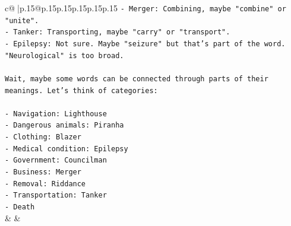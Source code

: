 \documentclass{article}
\begin{document}
{\begin{supertabular}{c@{$\;$}|p{.15\linewidth}@{}p{.15\linewidth}p{.15\linewidth}p{.15\linewidth}p{.15\linewidth}p{.15\linewidth}}
{{{\texttt{{-} Merger: Combining, maybe "combine" or "unite".} \\
\texttt{{-} Tanker: Transporting, maybe "carry" or "transport".} \\
\texttt{{-} Epilepsy: Not sure. Maybe "seizure" but that's part of the word. "Neurological" is too broad.} \\
\\ 
\texttt{Wait, maybe some words can be connected through parts of their meanings. Let's think of categories:} \\
\\ 
\texttt{{-} Navigation: Lighthouse} \\
\texttt{{-} Dangerous animals: Piranha} \\
\texttt{{-} Clothing: Blazer} \\
\texttt{{-} Medical condition: Epilepsy} \\
\texttt{{-} Government: Councilman} \\
\texttt{{-} Business: Merger} \\
\texttt{{-} Removal: Riddance} \\
\texttt{{-} Transportation: Tanker} \\
\texttt{{-} Death} \\
            }
        }
    }
    & & \\ \\


\end{supertabular}}
\end{document}
